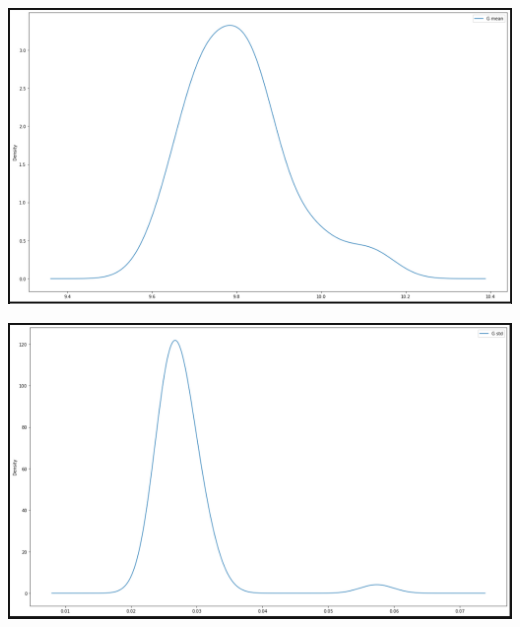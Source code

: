\documentclass[12pt, a4paper]{article}
\begin{document}
\begin{center}
      \includegraphics[width=.8\textwidth]{Pic 46.png}  
\end{center}

\begin{center}
      \includegraphics[width=.8\textwidth]{Pic 47.png}  
\end{center}
\end{document}
